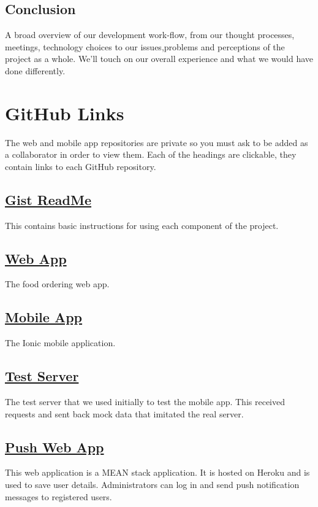 \subsection*{Conclusion}
A broad overview of our development work-flow, from our thought processes, meetings, technology choices to our issues,problems and perceptions of the project as a whole.
We'll touch on our overall experience and what we would have done differently.

\section{GitHub Links}
The web and mobile app repositories are private so you must ask to be added as a collaborator in order to view them.
Each of the headings are clickable, they contain links to each GitHub repository.

\subsection*{\href{http://gmit-catering.github.io/final-year-project-template/}{Gist ReadMe}}
This contains basic instructions for using each component of the project.

\subsection*{\href{https://github.com/VMarisevs/CanteenOrderSystem}{Web App}}
The food ordering web app.

\subsection*{\href{https://github.com/RonanC/gmit-catering}{Mobile App}}
The Ionic mobile application.

\subsection*{\href{https://github.com/RonanC/gmit-catering-test-server}{Test Server}}
The test server that we used initially to test the mobile app.
This received requests and sent back mock data that imitated the real server.

\subsection*{\href{https://github.com/RonanC/gmitcat-push}{Push Web App}}
This web application is a MEAN stack application.
It is hosted on Heroku and is used to save user details.
Administrators can log in and send push notification messages to registered users.

